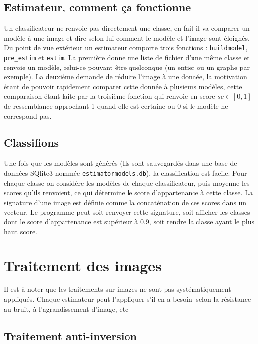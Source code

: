 \documentclass{article}
\theoremstyle{definition}
\begin{document}
  	   \subsection{Estimateur, comment ça fonctionne}
	Un classificateur ne renvoie pas directement une classe, en fait il va comparer un modèle à une image et dire selon lui comment le modèle et l'image sont éloignés. Du point de vue extérieur un estimateur comporte trois fonctions : \verb-buildmodel-, \verb-pre_estim- et \verb-estim-. La première donne une liste de fichier d'une même classe et renvoie un modèle, celui-ce pouvant être quelconque (un entier ou un graphe par exemple). La deuxième demande de réduire l'image à une donnée, la motivation étant de pouvoir rapidement comparer cette donnée à plusieurs modèles, cette comparaison étant faite par la troisième fonction qui renvoie un score $sc \in [0,1]$ de ressemblance approchant 1 quand elle est certaine ou 0 si le modèle ne correspond pas.

  	   \subsection{Classifions}
  	   Une fois que les modèles sont générés (Ils sont sauvegardés dans une base de données SQlite3 nommée \verb-estimatormodels.db-), la classification est facile. Pour chaque classe on considère les modèles de chaque classificateur, puis moyenne les scores qu'ils renvoient, ce qui détermine le score d'appartenance à cette classe. La signature d'une image est définie comme la concaténation de ces scores dans un vecteur. Le programme peut soit renvoyer cette signature, soit afficher les classes dont le score d'appartenance est supérieur à 0.9, soit rendre la classe ayant le plus haut score.
  
  \section{Traitement des images}
  
  	Il est à noter que les traitements sur images ne sont pas systématiquement appliqués. Chaque estimateur peut l'appliquer s'il en a besoin, selon la résistance au bruit, à l'agrandissement d'image, etc.
  
    \subsection{Traitement anti-inversion}
    
\end{document}
